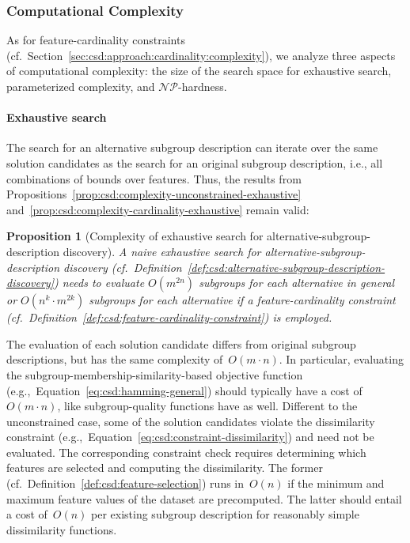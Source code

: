 \documentclass{article}
\newtheorem{proposition}{Proposition}
\theoremstyle{definition}
\begin{document}
\subsubsection{Computational Complexity}
\label{sec:csd:approach:alternatives:complexity}

As for feature-cardinality constraints (cf.~Section~\ref{sec:csd:approach:cardinality:complexity}), we analyze three aspects of computational complexity:
the size of the search space for exhaustive search, parameterized complexity, and $\mathcal{NP}$-hardness.

\paragraph{Exhaustive search}

The search for an alternative subgroup description can iterate over the same solution candidates as the search for an original subgroup description, i.e., all combinations of bounds over features.
Thus, the results from Propositions~\ref{prop:csd:complexity-unconstrained-exhaustive} and~\ref{prop:csd:complexity-cardinality-exhaustive} remain valid:
%
\begin{proposition}[Complexity of exhaustive search for alternative-subgroup-description discovery]
	A naive exhaustive search for alternative-subgroup-descrip\-tion discovery (cf.~Definition~\ref{def:csd:alternative-subgroup-description-discovery})
	needs to evaluate $O(m^{2n})$ subgroups for each alternative in general or $O(n^k \cdot m^{2k})$ subgroups for each alternative if a feature-cardinality constraint (cf.~Definition~\ref{def:csd:feature-cardinality-constraint}) is employed.
	\label{prop:csd:complexity-alternatives-exhaustive}
\end{proposition}
%
The evaluation of each solution candidate differs from original subgroup descriptions, but has the same complexity of~$O(m \cdot n)$.
In particular, evaluating the subgroup-membership-similarity-based objective function (e.g.,~Equation~\ref{eq:csd:hamming-general}) should typically have a cost of~$O(m \cdot n)$, like subgroup-quality functions have as well.
Different to the unconstrained case, some of the solution candidates violate the dissimilarity constraint (e.g.,~Equation~\ref{eq:csd:constraint-dissimilarity}) and need not be evaluated.
The corresponding constraint check requires determining which features are selected and computing the dissimilarity.
The former (cf.~Definition~\ref{def:csd:feature-selection}) runs in~$O(n)$ if the minimum and maximum feature values of the dataset are precomputed.
The latter should entail a cost of~$O(n)$ per existing subgroup description for reasonably simple dissimilarity functions.
\end{document}
